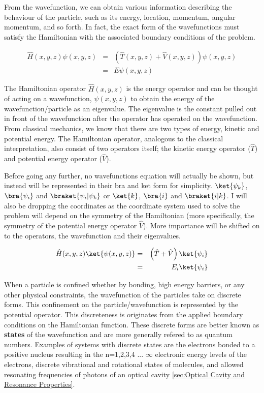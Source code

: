 \documentclass[11pt,a4paper]{book}
\begin{document}
	From the wavefunction, we can obtain various information describing the behaviour of the particle, such as its energy, location, momentum, angular momentum, and so forth. In fact, the exact form of the wavefunctions must satisfy the Hamiltonian with the associated boundary conditions of the problem.
	
	\begin{eqnarray}
		\label{eq:hamiltonian of wavefunction in cartesian}
		\hat{H} (x, y, z) \psi(x, y, z)
			&=&\left( \hat{T}(x, y, z) + \hat{V}(x, y, z) \right) \psi(x, y, z)\\
			&=&E\psi(x, y, z)
	\end{eqnarray}
	
	\noindent
	The Hamiltonian operator $\hat{H}(x,y,z)$ is the energy operator and can be thought of acting on a wavefunction, $\psi(x, y , z)$ to obtain the energy of the wavefunction/particle as an eigenvalue. The eigenvalue is the constant pulled out in front of the wavefunction after the operator has operated on the wavefunction. From classical mechanics, we know that there are two types of energy, kinetic and potential energy. The Hamiltonian operator, analogous to the classical interpretation, also consist of two operators itself; the kinetic energy operator ($\hat{T}$) and potential energy operator ($\hat{V}$). 
	
	Before going any further, no wavefunctions equation will actually be shown, but instead will be represented in their bra and ket form for simplicity. $\ket{\psi_k}$, $\bra{\psi_i}$ and $\braket{\psi_i|\psi_k}$ or $\ket{k}$, $\bra{i}$ and $\braket{i|k}$. I will also be dropping the coordinates as the coordinate system used to solve the problem will depend on the symmetry of the Hamiltonian (more specifically, the symmetry of the potential energy operator $\hat{V}$). More importance will be shifted on to the operators, the wavefunction and their eigenvalues.
	
	\begin{eqnarray}
		\label{eq:hamiltonian of wavefunction in braket notation}
		\hat{H}(x, y, z)\ket{\psi(x, y, z)}
		&=&\left( \hat{T} + \hat{V}\right) \ket{\psi_i}\\
		&=&E_i\ket{\psi_i}
	\end{eqnarray}
	
	When a particle is confined whether by bonding, high energy barriers, or any other physical constraints, the wavefunction of the particles take on discrete forms. This confinement on the particle/wavefunction is represented by the potential operator. This discreteness is originates from the applied boundary conditions on the Hamiltonian function. These discrete forms are better known as {\bfseries states} of the wavefunction and are more generally refered to as quantum numbers. Examples of systems with discrete states are the electrons bonded to a positive nucleus resulting in the n=1,2,3,4 ... $\infty$ electronic energy levels of the electrons, discrete vibrational and rotational states of molecules, and allowed resonating frequencies of photons of an optical cavity \autoref{sec:Optical Cavity and Resonance Properties}.
	\
	
\end{document}
